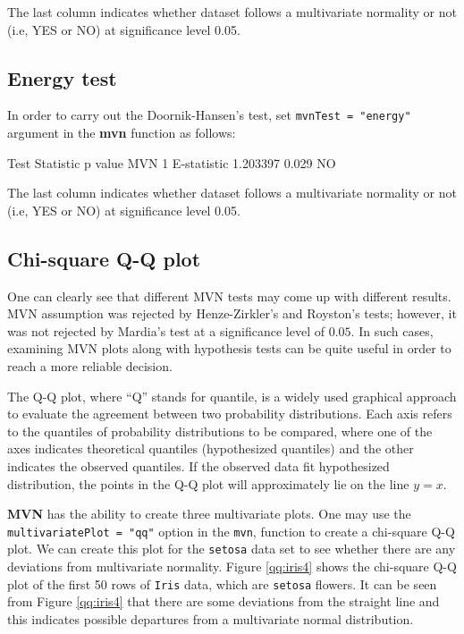 \documentclass[11pt]{article}
\begin{document}
The last column indicates whether dataset follows a multivariate normality or not (i.e, YES or NO) at significance level 0.05.

\subsection{Energy test} \label{subsec:energyRtexttt}

In order to carry out the Doornik-Hansen's test, set \texttt{mvnTest = "energy"} argument in the \textbf{mvn} function as follows:

\begin{Schunk}
\begin{Soutput}
         Test Statistic p value MVN
1 E-statistic  1.203397   0.029  NO
\end{Soutput}
\end{Schunk}

The last column indicates whether dataset follows a multivariate normality or not (i.e, YES or NO) at significance level 0.05.

\subsection{Chi-square Q-Q plot}

One can clearly see that different MVN tests may come up with different results. MVN assumption was rejected by Henze-Zirkler's and Royston's tests; however, it was not rejected by Mardia's test at a significance level of $0.05$. In such cases, examining MVN plots along with hypothesis tests can be quite useful in order to reach a more reliable decision.

The Q-Q plot, where ``Q'' stands for quantile, is a widely used graphical approach to evaluate the agreement between two probability distributions. Each axis refers to the quantiles of probability distributions to be compared, where one of the axes indicates theoretical quantiles (hypothesized quantiles) and the other indicates the observed quantiles. If the observed data fit hypothesized distribution, the points in the Q-Q plot will approximately lie on the line $y = x$.

\textbf{MVN} has the ability to create three multivariate plots. One may use the \texttt{multivariatePlot = "qq"} option in the \texttt{mvn}, function to create a chi-square Q-Q plot. We can create this plot for the \texttt{setosa} data set to see whether there are any deviations from multivariate normality. Figure \ref{qq:iris4} shows the chi-square Q-Q plot of the first 50 rows of \texttt{Iris} data, which are \texttt{setosa} flowers. It can be seen from Figure \ref{qq:iris4} that there are some deviations from the straight line and this indicates possible departures from a multivariate normal distribution.
\end{document}
